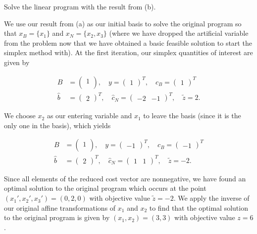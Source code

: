 Solve the linear program with the result from (b).

\begin{solution}

    We use our result from (a) as our initial basis to solve the original program so that $x_B = \{ x_1 \}$ and 
    $x_N = \{ x_2, x_3 \}$ (where we have dropped the artificial variable from the problem now that we have obtained a
    basic feasible solution to start the simplex method with). At the first iteration, our simplex quantities of interest are given by

    \begin{align*}
      B &= \begin{pmatrix}
        1  \\
      \end{pmatrix}, \quad y = \begin{pmatrix}
        1 
      \end{pmatrix}^T, \quad c_B = \begin{pmatrix}
        1
      \end{pmatrix}^T \\
      \hat{b} &= \begin{pmatrix}
        2
      \end{pmatrix}^T, \quad \hat{c}_N = \begin{pmatrix}
        -2 & -1 
      \end{pmatrix}^T, \quad \tilde{z} = 2.
    \end{align*}

    We choose $x_2$ as our entering variable and $x_1$ to leave the basis (since it is the only one in the basis),
    which yields

    \begin{align*}
      B &= \begin{pmatrix}
        1  \\
      \end{pmatrix}, \quad y = \begin{pmatrix}
       -1 
      \end{pmatrix}^T, \quad c_B = \begin{pmatrix}
       -1
      \end{pmatrix}^T \\
      \hat{b} &= \begin{pmatrix}
        2
      \end{pmatrix}^T, \quad \hat{c}_N = \begin{pmatrix}
        1 & 1
      \end{pmatrix}^T, \quad \tilde{z} = -2.
    \end{align*}

    Since all elements of the reduced cost vector are nonnegative, we have found an optimal solution to the original
    program which occurs at the point $(x_1', x_2', x_3') = (0, 2, 0)$ with objective value $\tilde{z} = -2$. We apply
    the inverse of our original affine transformations of $x_1$ and $x_2$ to find that the optimal solution to the 
    original program is given by $(x_1, x_2) = (3, 3)$ with objective value $z = 6$.

\end{solution}